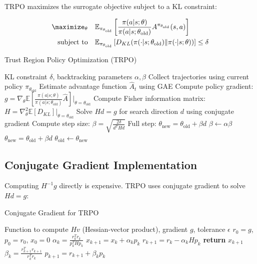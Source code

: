 TRPO maximizes the surrogate objective subject to a KL constraint:

\begin{align}
\maximize_\theta \quad & \mathbb{E}_{\pi_{\theta_{\text{old}}}} \left[ \frac{\pi(a|s; \theta)}{\pi(a|s; \theta_{\text{old}})} A^{\pi_{\theta_{\text{old}}}}(s,a) \right] \\
\text{subject to} \quad & \mathbb{E}_{\pi_{\theta_{\text{old}}}} \left[ D_{KL}(\pi(\cdot|s; \theta_{\text{old}}) \| \pi(\cdot|s; \theta)) \right] \leq \delta
\end{align}

\begin{algorithm}
\caption{Trust Region Policy Optimization (TRPO)}
\begin{algorithmic}
\REQUIRE KL constraint $\delta$, backtracking parameters $\alpha, \beta$
    \STATE Collect trajectories using current policy $\pi_{\theta_{\text{old}}}$
    \STATE Estimate advantage function $\hat{A}_t$ using GAE
    \STATE Compute policy gradient: $g = \nabla_\theta \mathbb{E} \left[ \frac{\pi(a|s; \theta)}{\pi(a|s; \theta_{\text{old}})} \hat{A} \right] \bigg|_{\theta=\theta_{\text{old}}}$
    \STATE Compute Fisher information matrix: $H = \nabla^2_\theta \mathbb{E} [D_{KL}] \big|_{\theta=\theta_{\text{old}}}$
    \STATE Solve $H d = g$ for search direction $d$ using conjugate gradient
    \STATE Compute step size: $\beta = \sqrt{\frac{2\delta}{d^T H d}}$
    \STATE Full step: $\theta_{\text{new}} = \theta_{\text{old}} + \beta d$
        \STATE $\beta \leftarrow \alpha \beta$ 
        \STATE $\theta_{\text{new}} = \theta_{\text{old}} + \beta d$
    \ENDWHILE
    \STATE $\theta_{\text{old}} \leftarrow \theta_{\text{new}}$
\ENDFOR
\end{algorithmic}
\end{algorithm}

\subsection{Conjugate Gradient Implementation}

Computing $H^{-1}g$ directly is expensive. TRPO uses conjugate gradient to solve $Hd = g$:

\begin{algorithm}
\caption{Conjugate Gradient for TRPO}
\begin{algorithmic}
\REQUIRE Function to compute $Hv$ (Hessian-vector product), gradient $g$, tolerance $\epsilon$
\STATE $r_0 = g$, $p_0 = r_0$, $x_0 = 0$
    \STATE $\alpha_k = \frac{r_k^T r_k}{p_k^T H p_k}$
    \STATE $x_{k+1} = x_k + \alpha_k p_k$
    \STATE $r_{k+1} = r_k - \alpha_k H p_k$
        \STATE \textbf{return} $x_{k+1}$
    \ENDIF
    \STATE $\beta_k = \frac{r_{k+1}^T r_{k+1}}{r_k^T r_k}$
    \STATE $p_{k+1} = r_{k+1} + \beta_k p_k$
\ENDFOR
\end{algorithmic}
\end{algorithm}

